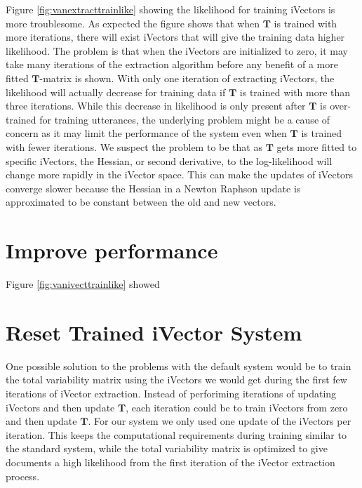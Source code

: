Figure \ref{fig:vanextracttrainlike} showing the likelihood for training iVectors is more troublesome. As expected the figure shows that when $\mathbf{T}$ is trained with more iterations, there will exist iVectors that will give the training data higher likelihood. The problem is that when the iVectors are initialized to zero, it may take many iterations of the extraction algorithm before any benefit of a more fitted $\mathbf{T}$-matrix is shown. With only one iteration of extracting iVectors, the likelihood will actually decrease for training data if $\mathbf{T}$ is trained with more than three iterations. While this decrease in likelihood is only present after $\mathbf{T}$ is over-trained for training utterances, the underlying problem might be a cause of concern as it may limit the performance of the system even when $\mathbf{T}$ is trained with fewer iterations. We suspect the problem to be that as $\mathbf{T}$ gets more fitted to specific iVectors, the Hessian, or second derivative, to the log-likelihood will change more rapidly in the iVector space. This can make the updates of iVectors converge slower because the Hessian in a Newton Raphson update is approximated to be constant between the old and new vectors. 


\section{Improve performance}

Figure \ref{fig:vanivecttrainlike} showed 


\section{Reset Trained iVector System}

One possible solution to the problems with the default system would be to train the total variability matrix using the iVectors we would get during the first few iterations of iVector extraction. Instead of perforiming iterations of updating iVectors and then update $\mathbf{T}$, each iteration could be to train iVectors from zero and then update $\mathbf{T}$. For our system we only used one update of the iVectors per iteration. This keeps the computational requirements during training similar to the standard system, while the total variability matrix is optimized to give documents a high likelihood from the first iteration of the iVector extraction process. 

